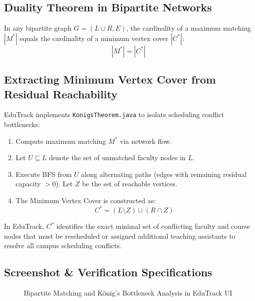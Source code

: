 \subsection{Duality Theorem in Bipartite Networks}
\begin{theorem}
In any bipartite graph $G = (L \cup R, E)$, the cardinality of a maximum matching $|M^*|$ equals the cardinality of a minimum vertex cover $|C^*|$:
\begin{equation}
|M^*| = |C^*|
\end{equation}
\end{theorem}

\subsection{Extracting Minimum Vertex Cover from Residual Reachability}
EduTrack implements \texttt{KonigsTheorem.java} to isolate scheduling conflict bottlenecks:
\begin{enumerate}
    \item Compute maximum matching $M^*$ via network flow.
    \item Let $U \subseteq L$ denote the set of unmatched faculty nodes in $L$.
    \item Execute BFS from $U$ along alternating paths (edges with remaining residual capacity $> 0$). Let $Z$ be the set of reachable vertices.
    \item The Minimum Vertex Cover is constructed as:
    \begin{equation}
    C^* = (L \setminus Z) \cup (R \cap Z)
    \end{equation}
\end{enumerate}
In EduTrack, $C^*$ identifies the exact minimal set of conflicting faculty and course nodes that must be rescheduled or assigned additional teaching assistants to resolve all campus scheduling conflicts.

\subsection{Screenshot \& Verification Specifications}
\begin{figure}[H]
    \centering
    \caption{Bipartite Matching and König's Bottleneck Analysis in EduTrack UI}
    \label{fig:screenshot_flow}
\end{figure}
